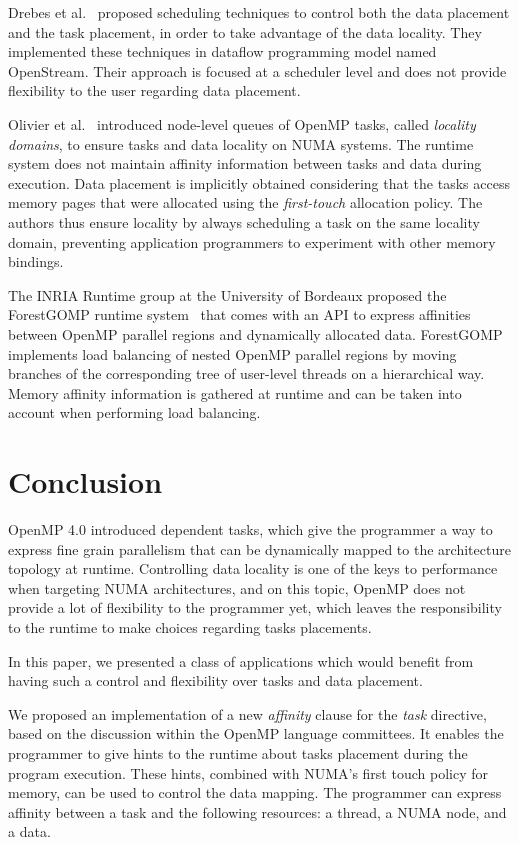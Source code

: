 \documentclass{Styles/llncs}
\begin{document}
Drebes et al.~\cite{Drebes:2014:TDS:2658949.2641764} proposed scheduling
techniques to control both the data placement and the task placement, in order to
take advantage of the data locality. They implemented these techniques
in dataflow programming model named OpenStream.
Their approach is focused at a scheduler level and does not provide
flexibility to the user regarding data placement.

Olivier et
al.~\cite{Olivier:2012:CMW:2388996.2389085}
introduced node-level queues of OpenMP tasks, called \textit{locality
  domains}, to ensure tasks and data locality on NUMA systems. The
runtime system does not maintain affinity information between tasks
and data during execution. Data placement is implicitly obtained
considering that the tasks access memory pages that were allocated
using the \textit{first-touch} allocation policy. The authors thus
ensure locality by always scheduling a task on the same locality
domain, preventing application programmers to experiment with other
memory bindings.

The INRIA Runtime group at the University of Bordeaux proposed the
ForestGOMP runtime system~\cite{BroFurGogWacNam10IJPP} that comes
with an API to express affinities between OpenMP parallel regions and
dynamically allocated data. ForestGOMP implements load balancing of
nested OpenMP parallel regions by moving branches of the corresponding
tree of user-level threads on a hierarchical way. Memory affinity
information is gathered at runtime and can be taken into account when
performing load balancing.

\section{Conclusion}

OpenMP 4.0 introduced dependent tasks, which give the programmer a way to
express fine grain parallelism that can be dynamically mapped to the architecture
topology at runtime.
Controlling data locality is one of the keys to performance when targeting NUMA architectures,
and on this topic, OpenMP does not provide a lot of flexibility to the programmer yet,
which leaves the responsibility to the runtime to make choices regarding tasks
placements.

In this paper, we presented a class of applications which would benefit
from having such a control and flexibility over tasks and data placement.

We proposed an implementation of a new \emph{affinity} clause for the \emph{task} directive,
based on the discussion within the OpenMP language committees.
It enables the programmer to give hints to the runtime about
tasks placement during the program execution.
These hints, combined with NUMA's first touch policy for memory, can be used to control the data
mapping. The programmer can express affinity between a task and the following resources: a thread, a NUMA node, and
a data.
\end{document}
